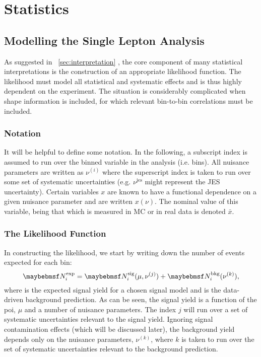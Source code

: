 \chapter{Statistics}
\section{Modelling the Single Lepton Analysis}
\label{sec:inter_1lepton}
As suggested in \chap~\ref{sec:interpretation} , the core component of many
statistical interpretations is the construction of an appropriate likelihood
function. The likelihood must model all statistical and systematic effects and
is thus highly dependent on the experiment. The situation is considerably
complicated when shape information is included, for which relevant bin-to-bin
correlations must be included.

\subsection{Notation}
It will be helpful to define some notation. In the following, a subscript index
is assumed to run over the binned variable in the analysis (i.e. \STlep
bins). All nuisance parameters are written as $\nu^{(i)}$ where the superscript
index is taken to run over some set of systematic uncertainties
(e.g. $\nu^{\textrm{jes}}$ might represent the \ac{JES} uncertainty). Certain
variables $x$ are known to have a functional dependence on a given nuisance
parameter and are written $x(\nu)$. The nominal value of this variable, being
that which is measured in \ac{MC} or in real data is denoted $\bar{x}$.

\subsection{The Likelihood Function}
In constructing the likelihood, we start by writing down the number of events
expected for each bin:
\begin{equation*}
\NExpi = \NSigi(\mu, \nu^{(j)}) +
\NBkgi(\nu^{(k)}),
\end{equation*}
where \NSigi is the expected signal yield for a chosen signal model and \NBkgi
is the data-driven background prediction. As can be seen, the signal yield is a
function of the \ac{poi}, $\mu$ and a number of nuisance parameters. The index
$j$ will run over a set of systematic uncertainties relevant to the signal
yield. Ignoring signal contamination effects (which will be discussed later),
the background yield depends only on the nuisance parameters, $\nu^{(k)}$, where
$k$ is taken to run over the set of systematic uncertainties relevant to the
background prediction.

